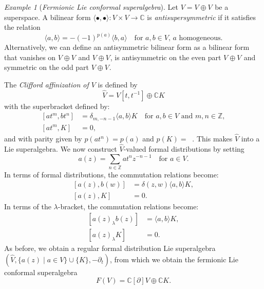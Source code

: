 \documentclass[a4paper, 12pt, reqno]{amsart}
\theoremstyle{remark}
\newtheorem{example}[theorem]{Example}
\DeclareMathOperator{\zero}{\overline{0}}
\DeclareMathOperator{\one}{\overline{1}}
\begin{document}
\begin{example}[\emph{Fermionic Lie conformal superalgebra}]
  \label{exa:3}
  Let $V = V_{\zero} \oplus V_{\one}$ be a superspace.
  A bilinear form $\langle\bullet, \bullet\rangle: V \times V \to \mathbb{C}$ is \emph{antisupersymmetric} if it satisfies the relation
  \begin{equation*}
    \langle a, b\rangle = -(-1)^{p(a)}\langle b, a\rangle \quad \text{for $a, b \in V$, $a$ homogeneous}.
  \end{equation*}
  Alternatively, we can define an antisymmetric bilinear form as a bilinear form that vanishes on $V_{\zero} \oplus V_{\one}$ and $V_{\one} \oplus V_{\zero}$, is antisymmetric on the even part $V_{\zero} \oplus V_{\zero}$ and symmetric on the odd part $V_{\one} \oplus V_{\one}$.

  The \emph{Clifford affinization of $V$} is defined by
  \begin{equation*}
    \widehat{V} = V[t, t^{-1}] \oplus \mathbb{C}K
  \end{equation*}
  with the superbracket defined by:
  \begin{equation*}
    \begin{split}
      [at^m, bt^n] &= \delta_{m, -n - 1}\langle a, b\rangle K \quad \text{for $a, b \in V$ and $m, n \in \mathbb{Z}$}, \\
      [at^m, K] &= 0,
    \end{split}
  \end{equation*}
  and with parity given by $p(at^n) = p(a)$ and $p(K) = \zero$.
  This makes $\widehat{V}$ into a Lie superalgebra.
  We now construct $\widehat{V}$-valued formal distributions by setting
  \begin{equation*}
    a(z) = \sum_{n \in \mathbb{Z}}at^nz^{-n - 1} \quad \text{for $a \in V$}.
  \end{equation*}
  In terms of formal distributions, the commutation relations become:
  \begin{equation*}
    \begin{split}
      [a(z), b(w)] &= \delta(z, w)\langle a, b\rangle K, \\
      [a(z), K] &= 0.
    \end{split}
  \end{equation*}
  In terms of the $\lambda$-bracket, the commutation relations become:
  \begin{equation*}
    \begin{split}
      [a(z)_{\lambda}b(z)] &= \langle a, b\rangle K, \\
      [a(z)_{\lambda}K] &= 0.
    \end{split}
  \end{equation*}
  As before, we obtain a regular formal distribution Lie superalgebra $(\widehat{V}, \{a(z) \mid a \in V\} \cup \{K\}, -\partial_t)$, from which we obtain the fermionic Lie conformal superalgebra
  \begin{equation*}
    F(V) = \mathbb{C}[\partial]V \oplus \mathbb{C}K.
  \end{equation*}
\end{example}
\end{document}
